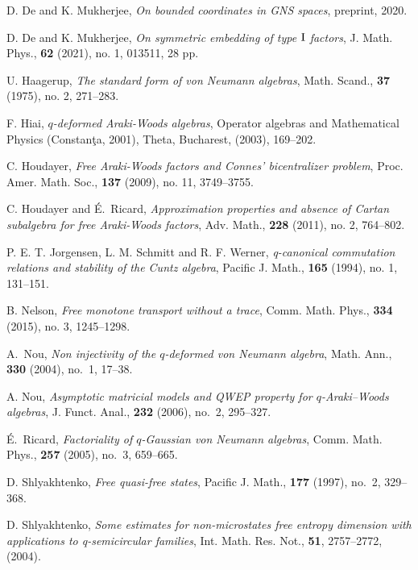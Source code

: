\documentclass[12pt, a4paper,reqno]{amsart}
\theoremstyle{definition}
\begin{document}
\begin{thebibliography}{}
D. De and K. Mukherjee, \emph{On bounded coordinates in GNS spaces}, preprint, 2020.

D. De and K. Mukherjee, \emph{On symmetric embedding of type $\rm{I}$ factors}, J. Math. Phys., \textbf{62} (2021), no. 1, 013511, 28 pp.

	
U. Haagerup, \emph{The standard form of von Neumann algebras}, Math. Scand., \textbf{37}  (1975), no. 2, 271--283.  

F. Hiai, \emph{{$q$}-deformed {A}raki-{W}oods algebras}, Operator algebras and Mathematical Physics ({C}onstan\c ta, 2001), Theta, Bucharest, (2003), 169--202. 
	
C. Houdayer, \emph{Free Araki-Woods factors and Connes' bicentralizer problem}, Proc. Amer. Math. Soc., \textbf{137} (2009), no. 11, 3749--3755.
	
C. Houdayer and \'{E}.~Ricard, \emph{Approximation properties and absence of Cartan subalgebra for free Araki-Woods factors}, Adv. Math., \textbf{228} (2011), no. 2, 764--802. 
		
 P. E. T. Jorgensen, L. M. Schmitt and R. F.  Werner, \emph{ q-canonical commutation relations and stability of the Cuntz algebra},  Pacific J. Math.,  \textbf{165} (1994), no. 1, 131--151.
	
B. Nelson, \emph{Free monotone transport without a trace}, Comm. Math. Phys.,
\textbf{334} (2015), no. 3, 1245--1298.  
	
A.~Nou, \emph{Non injectivity of the {$q$}-deformed von {N}eumann algebra}, Math. Ann., \textbf{330} (2004), no.~1, 17--38. 
	
A. Nou, \emph{Asymptotic matricial models and {QWEP} property for {$q$}-{A}raki--{W}oods algebras}, J. Funct. Anal., \textbf{232} (2006), no.~2, 295--327. 
	
\'{E}.~Ricard, \emph{Factoriality of {$q$}-{G}aussian von {N}eumann algebras}, Comm. Math. Phys., \textbf{257} (2005), no.~3, 659--665. 
	
D. Shlyakhtenko, \emph{Free quasi-free states}, Pacific J. Math., \textbf{177} (1997), no.~2, 329--368. 
	
 D. Shlyakhtenko, \emph{Some estimates for non-microstates free entropy dimension with applications to q-semicircular families}, Int. Math. Res. Not., \textbf{51}, 2757--2772, (2004).  
	

\end{thebibliography}
\end{document}
